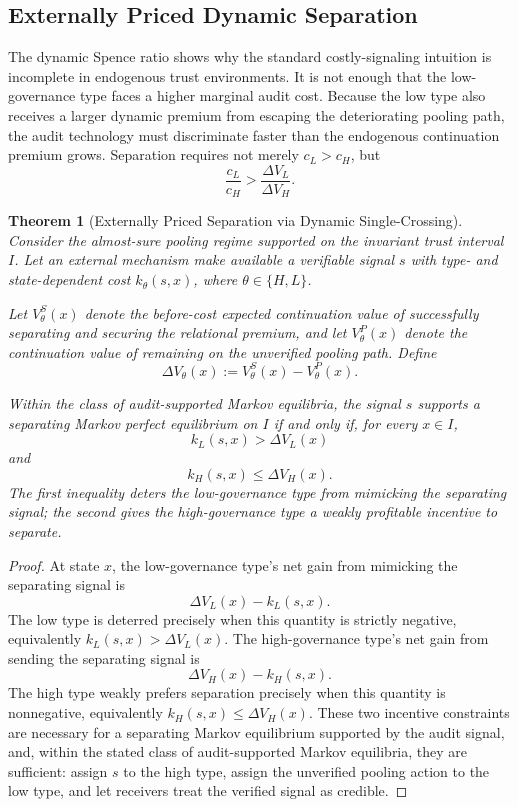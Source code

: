 \documentclass[review,authoryear]{elsarticle}
\newtheorem{theorem}{Theorem}
\theoremstyle{definition}
\theoremstyle{plain}
\begin{document}
\subsection{Externally Priced Dynamic Separation}
\label{subsec:dynamic-separation}

The dynamic Spence ratio shows why the standard costly-signaling intuition is
incomplete in endogenous trust environments.  It is not enough that the
low-governance type faces a higher marginal audit cost.  Because the low type
also receives a larger dynamic premium from escaping the deteriorating pooling
path, the audit technology must discriminate faster than the endogenous
continuation premium grows.  Separation requires not merely $c_L>c_H$, but
\[
\frac{c_L}{c_H}>
\frac{\Delta V_L}{\Delta V_H}.
\]

\begin{theorem}[Externally Priced Separation via Dynamic Single-Crossing]
\label{thm:externally-priced-dynamic-separation}
Consider the almost-sure pooling regime supported on the invariant trust
interval $I$. Let an external mechanism make available a verifiable signal
$s$ with type- and state-dependent cost $k_\theta(s,x)$, where
$\theta\in\{H,L\}$.

Let $V_\theta^S(x)$ denote the before-cost expected continuation value of
successfully separating and securing the relational premium, and let
$V_\theta^P(x)$ denote the continuation value of remaining on the unverified
pooling path. Define
\[
\Delta V_\theta(x)
:=
V_\theta^S(x)-V_\theta^P(x).
\]

Within the class of audit-supported Markov equilibria, the signal $s$
supports a separating Markov perfect equilibrium on $I$ if and only if, for
every $x\in I$,
\[
k_L(s,x)>\Delta V_L(x)
\]
and
\[
k_H(s,x)\le \Delta V_H(x).
\]
The first inequality deters the low-governance type from mimicking the
separating signal; the second gives the high-governance type a weakly
profitable incentive to separate.
\end{theorem}
\begin{proof}
At state $x$, the low-governance type's net gain from mimicking the
separating signal is
\[
\Delta V_L(x)-k_L(s,x).
\]
The low type is deterred precisely when this quantity is strictly negative,
equivalently $k_L(s,x)>\Delta V_L(x)$.  The high-governance type's net gain
from sending the separating signal is
\[
\Delta V_H(x)-k_H(s,x).
\]
The high type weakly prefers separation precisely when this quantity is
nonnegative, equivalently $k_H(s,x)\le\Delta V_H(x)$.  These two incentive
constraints are necessary for a separating Markov equilibrium supported by
the audit signal, and, within the stated class of audit-supported Markov
equilibria, they are sufficient: assign $s$ to the high type, assign the
unverified pooling action to the low type, and let receivers treat the
verified signal as credible.
\end{proof}
\end{document}
